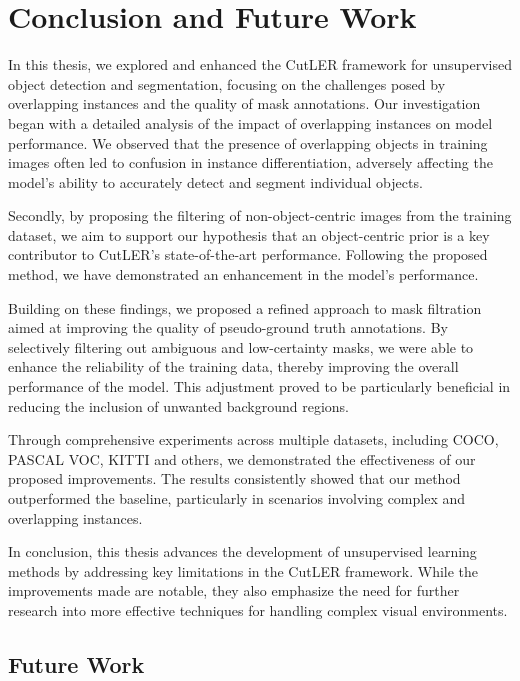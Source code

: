 \chapter{Conclusion and Future Work}\label{chap:conclusion}
In this thesis, we explored and enhanced the CutLER framework for unsupervised object detection and segmentation, focusing on the challenges posed by overlapping instances and the quality of mask annotations. Our investigation began with a detailed analysis of the impact of overlapping instances on model performance. We observed that the presence of overlapping objects in training images often led to confusion in instance differentiation, adversely affecting the model's ability to accurately detect and segment individual objects.

Secondly, by proposing the filtering of non-object-centric images from the training dataset, we aim to support our hypothesis that an object-centric prior is a key contributor to CutLER's state-of-the-art performance. Following the proposed method, we have demonstrated an enhancement in the model's performance.

Building on these findings, we proposed a refined approach to mask filtration aimed at improving the quality of pseudo-ground truth annotations. By selectively filtering out ambiguous and low-certainty masks, we were able to enhance the reliability of the training data, thereby improving the overall performance of the model. This adjustment proved to be particularly beneficial in reducing the inclusion of unwanted background regions.

Through comprehensive experiments across multiple datasets, including COCO, PASCAL VOC, KITTI and others, we demonstrated the effectiveness of our proposed improvements. The results consistently showed that our method outperformed the baseline, particularly in scenarios involving complex and overlapping instances.

In conclusion, this thesis advances the development of unsupervised learning methods by addressing key limitations in the CutLER framework. While the improvements made are notable, they also emphasize the need for further research into more effective techniques for handling complex visual environments.

\section{Future Work}
